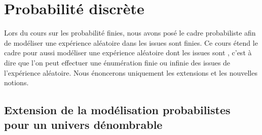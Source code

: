 \documentclass{book}
\begin{document}
\chapter*{Probabilité discrète}
Lors du cours sur les probabilité finies, nous avons posé le cadre probabiliste afin de modéliser une expérience aléatoire dans les issues sont finies. Ce cours étend le cadre pour aussi modéliser une expérience aléatoire dont les issues sont , c'est à dire que l'on peut effectuer une énumération finie ou infinie des issues de l'expérience aléatoire.  Nous énoncerons uniquement les extensions et les nouvelles notions.   
 

\section{Extension  de la modélisation probabilistes pour un univers dénombrable}
\end{document}
